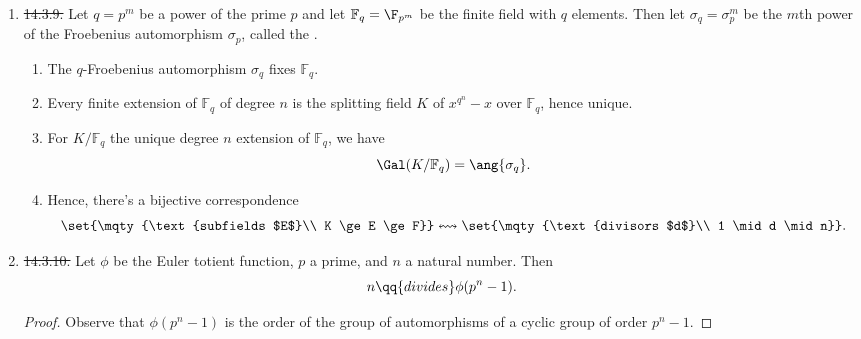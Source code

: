 \documentclass[onesided]{ccg-pset}
\newcommand{\Fq}{\mathbb{F}_q} %
\begin{document}
\begin{enumerate}
    \item \label{14.3.9} \sout{ 14.3.9. }
        Let $q = p^m$ be a power of the prime $p$ and let $\Fq = \F_{p^m}$ be the finite field with $q$ elements. Then let $\sigma_q = \sigma_p^m$ be the $m$th power of the Froebenius automorphism $\sigma_p$, called the .

        \begin{enumerate}
    \item The $q$-Froebenius automorphism $\sigma_q$ fixes $\Fq$.
        \item Every finite extension of $\Fq$ of degree $n$ is the splitting field $K$ of $x^{q^n} -x$ over $\Fq$, hence unique.
        \item For $K/\Fq$ the unique degree $n$ extension of $\Fq$, we have 
        \[
        \Gal(K/\Fq) = \ang{\sigma_q}
    .\]
        \item Hence, there's a bijective correspondence
        \[
        \set{\mqty{\text{subfields $E$}\\
            K \ge E \ge F}} 
    \leftrightsquigarrow 
        \set{\mqty{\text{divisors $d$}\\
            1 \mid d \mid n}}
    .\]
        \end{enumerate}

    \item \label{14.3.10} \sout{ 14.3.10. }
        Let $\phi$ be the Euler totient function, $p$ a prime, and $n$ a natural number. Then
        \[
        n \qq{divides} \phi(p^n -1)
            .\]
            \begin{proof}
    Observe that $\phi(p^n -1)$ is the order of the group of automorphisms of a cyclic group of order $p^n -1$.
        \end{proof}

\end{enumerate}
\end{document}
